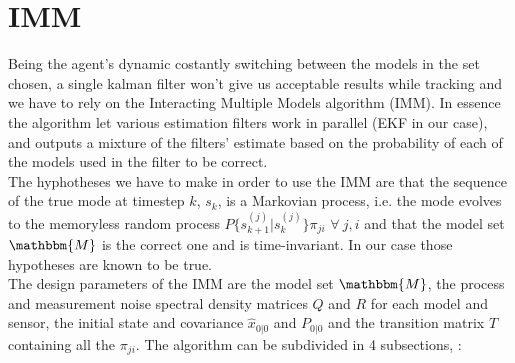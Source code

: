 \documentclass[twocolumn]{article}
\begin{document}
\section*{IMM}
Being the agent's dynamic costantly switching between the models in the set chosen, a single kalman filter won't give us acceptable results while 
tracking and we have to rely on the Interacting Multiple Models algorithm (IMM). In essence the algorithm let various estimation filters work in parallel
 (EKF in our case), and outputs a mixture of the filters' estimate based on the probability of each of the models used in the filter to be correct.
 \\
The hyphotheses we have to make in order to use the IMM are that the sequence of the true mode at timestep $k$, $s_{k}$, is a Markovian process, i.e. the mode evolves to the 
memoryless random process $P\{s_{k+1}^{(j)}|s_{k}^{(j)}\}\pi_{ji}$ $\forall\ j,i$ and that the model set $\mathbbm{M}$ is the correct one and is time-invariant.
In our case those hypotheses are known to be true.
\\
 The design parameters of the IMM are the model set $\mathbbm{M}$, the process and measurement noise spectral density 
 matrices $Q$ and $R$ for each model and sensor, the initial state and covariance $\hat{x}_{0|0}$ and $P_{0|0}$ 
 and the transition matrix $T$ containing all the $\pi_{ji}$.
 The algorithm can be subdivided in 4 subsections, :
\end{document}
